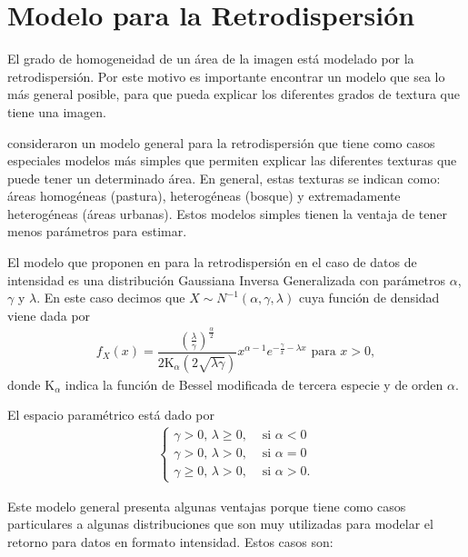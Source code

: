 \section{Modelo para la Retrodispersión}
\label{ModeloBackscatter}

El grado de homogeneidad de un área de la imagen está modelado por la retrodispersión. Por este motivo es importante encontrar un modelo que sea lo más general posible, para que pueda explicar los diferentes grados de textura que tiene una imagen.

\citet{Frery97} consideraron un modelo general para la retrodispersión que tiene como casos especiales modelos más simples que permiten explicar las diferentes texturas que puede tener un determinado área. En general, estas texturas se indican como: áreas homogéneas (pastura), heterogéneas (bosque) y extremadamente heterogéneas (áreas urbanas). Estos modelos simples tienen la ventaja de tener menos parámetros para estimar.

El modelo que proponen en \citet{Frery99} para la retrodispersión en el caso de datos de intensidad es una distribución Gaussiana Inversa Generalizada con parámetros $\alpha$, $\gamma$ y $\lambda$. En este caso decimos que  $X\sim N^{-1}(\alpha,\gamma,\lambda)$ cuya función de densidad viene dada por
\begin{align}
f_X(x) = \dfrac{\left(\frac{\lambda}{\gamma}\right)^{\frac{\alpha}{2}}}{2 \text{K}_{\alpha} (2 \sqrt{\lambda \gamma})} x^{\alpha-1} e^{-\frac{\gamma}{x}-\lambda x} \text{ para } x>0,
\label{GIG}
\end{align}
donde $\text{K}_{\alpha}$ indica la función de Bessel modificada de tercera especie y de orden $\alpha$. 

El espacio paramétrico está dado por
\begin{align}
\begin{cases}
\label{EspacioParametros}
	\gamma>0,      \,  \lambda \geq 0,  & \text{ si } \alpha < 0\\
	\gamma>0,      \,  \lambda >0,      & \text{ si } \alpha=0\\
	\gamma \geq 0, \,  \lambda >0,      & \text{ si } \alpha>0.
\end{cases}
\end{align}

Este modelo general presenta algunas ventajas porque tiene como casos particulares a algunas distribuciones que son muy utilizadas para modelar el retorno para datos en formato intensidad. Estos casos son:

